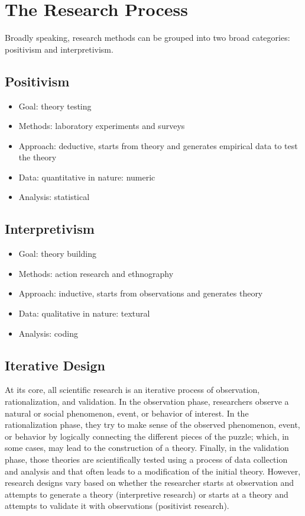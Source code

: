 \section{The Research Process}\label{04:process}

Broadly speaking, research methods can be grouped into two broad categories: \gls{positivism} and \gls{interpretivism}. 

\subsection{Positivism}

\begin{itemize}
	\item Goal: theory testing
	\item Methods: laboratory experiments and surveys
	\item Approach: deductive, starts from theory and generates empirical data to test the theory
	\item Data: quantitative in nature: numeric 
	\item Analysis: statistical
\end{itemize}

\subsection{Interpretivism}

\begin{itemize}
	\item Goal: theory building
	\item Methods: action research and ethnography
	\item Approach: inductive, starts from observations and generates theory
	\item Data: qualitative in nature: textural
	\item Analysis: coding
\end{itemize}

\subsection{Iterative Design}

At its core, all scientific research is an iterative process of observation, rationalization, and validation. In the observation phase, researchers observe a natural or social phenomenon, event, or behavior of interest. In the rationalization phase, they try to make sense of the observed phenomenon, event, or behavior by logically connecting the different pieces of the puzzle; which, in some cases, may lead to the construction of a theory. Finally, in the validation phase, those theories are scientifically tested using a process of data collection and analysis and that often leads to a modification of the initial theory. However, research designs vary based on whether the researcher starts at observation and attempts to generate a theory (interpretive research) or starts at a theory and attempts to validate it with observations (positivist research).


